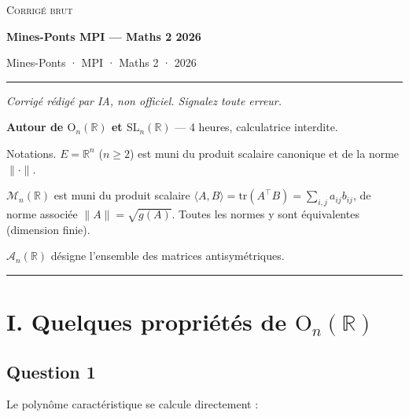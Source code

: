 \documentclass[11pt,a4paper]{article}
\newcommand{\equationajustee}[1]{%
  \sbox{\boiteequation}{$\displaystyle #1$}%
  \ifdim\wd\boiteequation>\linewidth
    \[\resizebox{\linewidth}{!}{\usebox{\boiteequation}}\]%
  \else
    \[#1\]%
  \fi}
\begin{document}
\thispagestyle{plain}
\begin{center}
  {\small\scshape Corrigé brut}\par\smallskip
  {\LARGE\bfseries Mines-Ponts MPI — Maths 2 2026\par}\medskip
  {\large Mines-Ponts · MPI · Maths 2 · 2026\par}
\end{center}
\vspace{2pt}\hrule\vspace{8pt}

\emph{Corrigé rédigé par IA, non officiel. Signalez toute erreur.}

\textbf{Autour de \({\mathrm{O}}_n(\mathbb R)\) et \({\mathrm{SL}}_n(\mathbb R)\)} --- 4 heures, calculatrice interdite.

Notations. \(E=\mathbb R^n\) (\(n\ge2\)) est muni du produit scalaire canonique et de la norme \(\|\cdot\|\).

\(\mathcal M_n(\mathbb R)\) est muni du produit scalaire \(\langle A,\allowbreak B\rangle=\mathrm{tr}(A^\top B)=\sum_{i,j}a_{ij}b_{ij}\), de norme associée \(\|A\|=\sqrt{g(A)}\). Toutes les normes y sont équivalentes (dimension finie).

\(\mathcal A_n(\mathbb R)\) désigne l'ensemble des matrices antisymétriques.

\begin{center}\rule{0.5\linewidth}{0.5pt}\end{center}

\hypertarget{i.-quelques-propriuxe9tuxe9s-de-mathrmo_nmathbb-r}{%
\section{\texorpdfstring{I. Quelques propriétés de \({\mathrm{O}}_n(\mathbb R)\)}{I. Quelques propriétés de \{\textbackslash mathrm\{O\}\}\_n(\textbackslash mathbb R)}}\label{i.-quelques-propriuxe9tuxe9s-de-mathrmo_nmathbb-r}}

\hypertarget{question-1}{%
\subsection{Question 1}\label{question-1}}

Le polynôme caractéristique se calcule directement :

\equationajustee{\begin{aligned}
\chi_{R_\theta}&=(X-\cos\theta)^2+\sin^2\theta\\
&=X^2-2\cos(\theta)X+1\\
&=(X-e^{i\theta})(X-e^{-i\theta}).
\end{aligned}}
\end{document}
